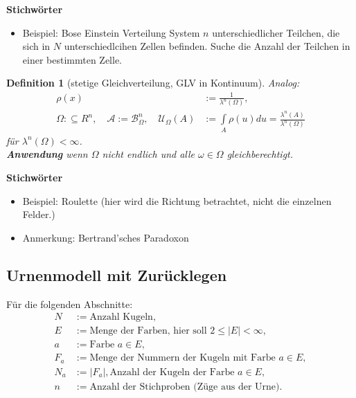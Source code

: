 \documentclass[a4paper,12pt]{article}%
\newtheorem{myDef}[thm]{Definition}
\newcommand{\A}{\mathcal{A}}
\newcommand{\B}{\mathcal{B}}
\newcommand{\U}{\mathcal{U}}
\newcommand{\invisible}[1]{#1}
\begin{document}
	\invisible{
		{\bf Stichwörter}
		\begin{itemize}
			\item Beispiel: Bose Einstein Verteilung
			System $n$ unterschiedlicher Teilchen, die sich in $N$ unterschiedlcihen Zellen befinden. 
			Suche die Anzahl der Teilchen in einer bestimmten Zelle.
		\end{itemize}
		
		
		}
	
	
	
	
	
	
	
	\begin{myDef}[stetige Gleichverteilung, GLV in Kontinuum]
		Analog:
		\begin{align*}
			\rho(x) &:= \frac{1}{\lambda^n(\Omega)},\\ 
			\Omega :\subseteq R^n,\quad
			\A := \B_{\Omega}^n,\quad
			\U_\Omega(A) &:= \int \limits_{A} \rho (u) d u = \frac{\lambda^n(A)}{\lambda^n(\Omega)}
		\end{align*}
		für $\lambda^n(\Omega) < \infty$.\\
		{\bf Anwendung} wenn $\Omega$ nicht endlich und alle $\omega \in \Omega$ gleichberechtigt.
	\end{myDef}
	
	\invisible{
		
		{\bf Stichwörter}
		\begin{itemize}
			\item Beispiel: Roulette (hier wird die Richtung betrachtet, nicht die einzelnen Felder.)
			\item Anmerkung: Bertrand'sches Paradoxon
		\end{itemize}
		
		
		}
	
	\newpage
	
	\subsection{Urnenmodell mit Zurücklegen }
	Für die folgenden Abschnitte:
	\begin{align*}
	N &:= \text{Anzahl Kugeln}, \\
	E &:= \text{Menge der Farben, hier soll } 2\leq |E| < \infty, \\
	a &:= \text{Farbe } a \in E,\\
	F_a &:= \text{Menge der Nummern der Kugeln mit Farbe } a \in E,\\
	N_a &:= |F_a|, \text{Anzahl der Kugeln der Farbe } a \in E,\\
	n&:= \text{Anzahl der Stichproben (Züge aus der Urne)}.
	\end{align*}
\end{document}
